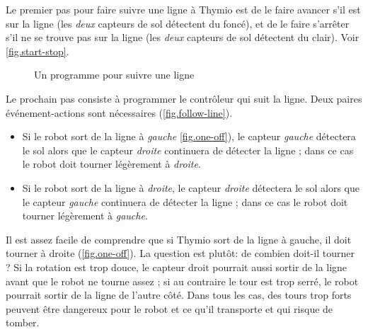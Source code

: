 Le premier pas pour faire suivre une ligne à Thymio est de le faire avancer s'il est sur la ligne (les \emph{deux} capteurs de sol détectent du foncé), et de le faire s'arrêter s'il ne se trouve pas sur la ligne (les \emph{deux} capteurs de sol détectent du clair).
Voir \cref{fig.start-stop}.

\begin{figure}
	\hfill
	\caption{Un programme pour suivre une ligne}
        \label{fig.follow-line-all}
\end{figure}



Le prochain pas consiste à programmer le contrôleur qui suit la ligne.
Deux paires événement-actions sont nécessaires (\cref{fig.follow-line}).

\begin{itemize}
    \item Si le robot sort de la ligne à \emph{gauche}
    \cref{fig.one-off}), le capteur \emph{gauche}
    détectera le sol alors que le capteur \emph{droite}
    continuera de détecter la ligne ;
    dans ce cas le robot doit tourner légèrement à
    \emph{droite}.

    \item Si le robot sort de la ligne à \emph{droite},
    le capteur \emph{droite} détectera le sol
    alors que le capteur \emph{gauche} continuera
    de détecter la ligne ; dans ce cas le robot
    doit tourner légèrement à \emph{gauche}.
	
\end{itemize}


Il est assez facile de comprendre que
si Thymio sort de la ligne à gauche,
il doit tourner à droite (\cref{fig.one-off}).
La question est plutôt: de combien doit-il tourner ?
Si la rotation est trop douce, le capteur droit pourrait aussi sortir de la ligne avant que le robot ne tourne assez ;
si au contraire le tour est trop serré, le robot pourrait sortir de la ligne de l'autre côté.
Dans tous les cas, des tours trop forts peuvent être dangereux pour le robot et ce qu'il transporte et qui risque de tomber.

